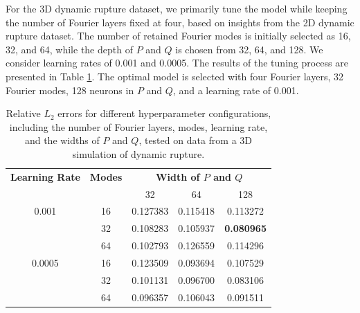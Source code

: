 \documentclass[draft]{agujournal2019}
\providecommand{\DIFaddend}{} %
\DeclareRobustCommand{\DIFaddend}{\DIFOaddend \let\includegraphics\DIFOincludegraphics} %
\begin{document}


\DIFaddend For the 3D dynamic rupture dataset, we primarily tune the model while keeping the number of Fourier layers fixed at four, based on insights from the 2D dynamic rupture dataset. The number of retained Fourier modes is initially selected as 16, 32, and 64, while the depth of \(P\) and \(Q\) is chosen from 32, 64, and 128. We consider learning rates of 0.001 and 0.0005. The results of the tuning process are presented in Table \ref{tab:3D_hyperparam}. The optimal model is selected with four Fourier layers, 32 Fourier modes, 128 neurons in \(P\) and \(Q\), and a learning rate of 0.001.


\begin{table}[ht!]
\caption{Relative \( L_2 \) errors for different hyperparameter configurations, including the number of Fourier layers, modes, learning rate, and the widths of \( P \) and \( Q \), tested on data from a 3D simulation of dynamic rupture.}
    \centering
    \begin{tabular}{ccccc}
        \toprule
        \textbf{Learning Rate} & \textbf{Modes} & \multicolumn{3}{c}{\textbf{Width of \(P\) and \(Q\)}} \\
        \cmidrule(lr){3-5}
        & & 32 & 64 & 128 \\
        \midrule
        0.001  & 16  & 0.127383 & 0.115418 & 0.113272  \\
               & 32  & 0.108283 & 0.105937 & \textbf{0.080965}  \\
               & 64  & 0.102793 & 0.126559 & 0.114296  \\
        0.0005 & 16  & 0.123509 & 0.093694  & 0.107529  \\
               & 32  & 0.101131 & 0.096700  & 0.083106  \\
               & 64  & 0.096357 & 0.106043 & 0.091511 \\
        \bottomrule
    \end{tabular}
    \label{tab:3D_hyperparam}
\end{table}
\end{document}
